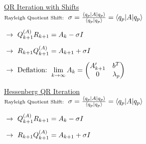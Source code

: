 \documentclass[12pt]{article}
\begin{document}
\vspace{15pt}
\underline{QR Iteration with Shifts}\\[10pt]
\(\begin{aligned}
	&\text{\scriptsize Rayleigh Quotient Shift: \ } \sigma 
		= \tfrac{\langle q_p | A | q_p \rangle}{\langle q_p | q_p \rangle} = \langle q_p | A | q_p \rangle\\[5pt]
	&\rightarrow\ Q_{k+1}^{(A)} R_{k+1} = A_k - \sigma I\\[5pt]
	&\rightarrow\ R_{k+1} Q_{k+1}^{(A)} = A_{k+1} + \sigma I\\[5pt]
	&\rightarrow\ \text{Deflation: } \lim_{k\rightarrow\infty} A_k = 
		\left( \begin{matrix}
			A'_{k+1} & b^T\\
			0 & \lambda_p
		\end{matrix} \right)
\end{aligned}\)

\vspace{15pt}
\underline{Hessenberg QR Iteration}\\[10pt]
\(\begin{aligned}
	&\text{\scriptsize Rayleigh Quotient Shift: \ } \sigma 
		= \tfrac{\langle q_p | A | q_p \rangle}{\langle q_p | q_p \rangle} = \langle q_p | A | q_p \rangle\\[5pt]
	&\rightarrow\ Q_{k+1}^{(A)} R_{k+1} = A_k - \sigma I\\[5pt]
	&\rightarrow\ R_{k+1} Q_{k+1}^{(A)} = A_{k+1} + \sigma I\\[5pt]
\end{aligned}\)
\end{document}
